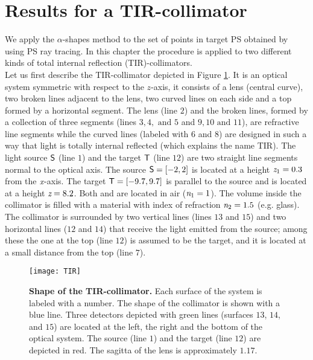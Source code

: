 \section{Results for a TIR-collimator}\label{sec:results-Tir-alpha}
We apply the $\alpha$-shapes method to the set of points in target PS obtained by using PS ray tracing.
In this chapter the procedure is applied to two different kinds of total internal reflection (TIR)-collimators.\\ \indent  
Let us first describe the TIR-collimator depicted in Figure \ref{fig:tir}. It is an optical system symmetric with respect to the $z$-axis, it consists of a lens (central curve), two broken lines adjacent to the lens,
two curved lines on each side and a top formed by a horizontal segment. The lens (line $2$) and the broken lines, formed by a collection of three segments (lines $3, 4, \mbox{ and } 5$ and $9, 10 \mbox{ and } 11$), are refractive line segments while the curved lines (labeled with $6$ and $8$) are designed in such a way that light is totally internal reflected (which explains the name TIR).
The light source $\textsf{S}$ (line $1$) and the target $\textsf{T}$ (line $12$) are two straight line segments normal to the optical axis.
The source $\textsf{S}= [-2,2]$ is located at a height $\textit{z}_{1} = 0.3$ from the $\textit{x}$-axis.
 The target $\textsf{T}= [-9.7, 9.7]$ is parallel to the source and is located at a height $ \textit{z}= 8.2$. Both  and  are located in air ($\textit{n}_1=1$).
The volume inside the collimator is filled with a material with index of refraction $\textit{n}_2=1.5$ (e.g. glass).
The collimator is surrounded by two vertical lines (lines $13$ and $15$) and two horizontal lines ($12$ and $14$) that receive the light emitted from the source; among these the one at the top (line $12$) is assumed to be the target, and it is located at a small distance from the top (line $7$). 
\begin{figure}[h]
  \begin{center}
  \texttt{[image: TIR]}
  \end{center}
  \caption{\textbf{Shape of the TIR-collimator.} Each surface of the system is labeled with a number.
   The shape of the collimator is shown with a blue line.
   Three detectors depicted with green lines (surfaces $13$, $14$, and $15$) are located at the left, the right and the bottom of the optical system. The source (line $1$) and the target (line $12$) are depicted in red.
The sagitta of the lens is approximately $1.17$.}
  \label{fig:tir}
\end{figure}
